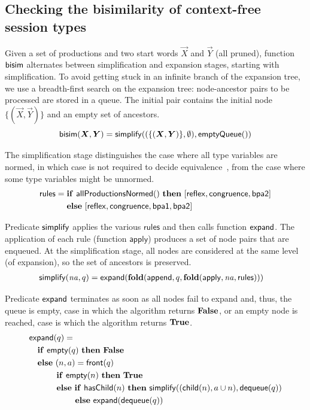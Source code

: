 \subsection{Checking the bisimilarity of context-free session types}

Given a set of productions and two start words $\vec X$ and $\vec Y$
(all pruned), function $\mathsf{bisim}$ alternates between simplification and
expansion stages, starting with simplification.
%
To avoid getting stuck in an infinite branch of the expansion tree, we
use a breadth-first search on the expansion tree: node-ancestor pairs
to be processed are stored in a queue. The initial pair contains the
initial node $\{(\vec X,\vec Y)\}$ and an empty set of ancestors.
%
\begin{equation*}
  \Bisim(\vec X, \vec Y) = \simplify((\{(\vec X,\vec Y)\},\emptyset), \mathsf{emptyQueue()})
\end{equation*}

The simplification stage distinguishes the case where all type
variables are normed, in which case  is not required to decide
equivalence~\cite{caucal1986decidabilite,DBLP:journals/iandc/ChristensenHS95},
from the case where some type variables might be unnormed.
%
\begin{align*}
  \mathsf{rules} =\;& \mathbf{if}\ \mathsf{allProductionsNormed()}\ \mathbf{then}\
  [\mathsf{reflex} ,\mathsf{congruence}, \mathsf{bpa2}]\\
  &\mathbf{else}\ [\mathsf{reflex} ,\mathsf{congruence}, \mathsf{bpa1} , \mathsf{bpa2}]
\end{align*}

Predicate $\mathsf{simplify}$ applies the various $\mathsf{rules}$ and then
calls function $\mathsf{expand}$.
%
The application of each rule (function $\mathsf{apply}$) produces a
set of node pairs that are enqueued. At the simplification stage,
all nodes are considered at the same level (of expansion), so the
set of ancestors is preserved.
%
\begin{align*}
  &\mathsf{simplify}(\mathit{na}, q) = \mathsf{expand}(\mathbf{fold}(\mathsf{append}, q,
    \mathbf{fold}(\mathsf{apply}, \mathit{na}, \mathsf{rules})))
\end{align*}

Predicate $\mathsf{expand}$ terminates as soon as all nodes fail to expand
and, thus, the queue is empty, case in which the algorithm returns
$\mathbf{False}$, or an empty node is reached, case is which the algorithm
returns $\mathbf{True}$.
%
\begin{align*}
  &\mathsf{expand}(q) =\\
  &\quad \mathbf{if}\ \mathsf{empty}(q)\ \mathbf{then}\ \mathbf{False}\\
  &\quad \mathbf{else}\ (n,a) = \mathsf{front}(q)\\
  & \qquad\quad\; \mathbf{if}\ \mathsf{empty}(n)\ \mathbf{then}\ \mathbf{True}\\
  & \qquad\quad\; \mathbf{else}\ \mathbf{if}\ \mathsf{hasChild}(n)\ \mathbf{then}\
    \mathsf{simplify}((\mathsf{child}(n), a \cup n), \mathsf{dequeue}(q))\\
  & \qquad\qquad\quad\;\: \mathbf{else}\ \mathsf{expand}(\mathsf{dequeue}(q))
\end{align*}


